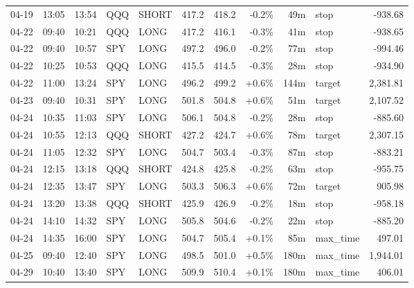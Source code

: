 \documentclass[11pt,a4paper,twoside]{article}
\begin{document}
\begin{center}
\begin{longtable}{>{\color{txtmain}}l l l l l r r r r >{\color{txtmain}}l r}
04-19 & 13:05 & 13:54 & QQQ & SHORT & 417.2 & 418.2 & \textcolor{lossred}{-0.2\%} & 49m & stop & \textcolor{lossred}{-938.68} \\
04-22 & 09:40 & 10:21 & QQQ & LONG & 417.2 & 416.1 & \textcolor{lossred}{-0.3\%} & 41m & stop & \textcolor{lossred}{-938.65} \\
04-22 & 09:40 & 10:57 & SPY & LONG & 497.2 & 496.0 & \textcolor{lossred}{-0.2\%} & 77m & stop & \textcolor{lossred}{-994.46} \\
04-22 & 10:25 & 10:53 & QQQ & LONG & 415.5 & 414.5 & \textcolor{lossred}{-0.3\%} & 28m & stop & \textcolor{lossred}{-934.90} \\
04-22 & 11:00 & 13:24 & SPY & LONG & 496.2 & 499.2 & \textcolor{wingreen}{+0.6\%} & 144m & target & \textcolor{wingreen}{2,381.81} \\
04-23 & 09:40 & 10:31 & SPY & LONG & 501.8 & 504.8 & \textcolor{wingreen}{+0.6\%} & 51m & target & \textcolor{wingreen}{2,107.52} \\
04-24 & 10:35 & 11:03 & SPY & LONG & 506.1 & 504.8 & \textcolor{lossred}{-0.2\%} & 28m & stop & \textcolor{lossred}{-885.60} \\
04-24 & 10:55 & 12:13 & QQQ & SHORT & 427.2 & 424.7 & \textcolor{wingreen}{+0.6\%} & 78m & target & \textcolor{wingreen}{2,307.15} \\
04-24 & 11:05 & 12:32 & SPY & LONG & 504.7 & 503.4 & \textcolor{lossred}{-0.3\%} & 87m & stop & \textcolor{lossred}{-883.21} \\
04-24 & 12:15 & 13:18 & QQQ & SHORT & 424.8 & 425.8 & \textcolor{lossred}{-0.2\%} & 63m & stop & \textcolor{lossred}{-955.75} \\
04-24 & 12:35 & 13:47 & SPY & LONG & 503.3 & 506.3 & \textcolor{wingreen}{+0.6\%} & 72m & target & \textcolor{wingreen}{905.98} \\
04-24 & 13:20 & 13:38 & QQQ & SHORT & 425.9 & 426.9 & \textcolor{lossred}{-0.2\%} & 18m & stop & \textcolor{lossred}{-958.18} \\
04-24 & 14:10 & 14:32 & SPY & LONG & 505.8 & 504.6 & \textcolor{lossred}{-0.2\%} & 22m & stop & \textcolor{lossred}{-885.20} \\
04-24 & 14:35 & 16:00 & SPY & LONG & 504.7 & 505.4 & \textcolor{wingreen}{+0.1\%} & 85m & max\_time & \textcolor{wingreen}{497.01} \\
04-25 & 09:40 & 12:40 & SPY & LONG & 498.5 & 501.0 & \textcolor{wingreen}{+0.5\%} & 180m & max\_time & \textcolor{wingreen}{1,944.01} \\
04-29 & 10:40 & 13:40 & SPY & LONG & 509.9 & 510.4 & \textcolor{wingreen}{+0.1\%} & 180m & max\_time & \textcolor{wingreen}{406.01} \\

\end{longtable}
\end{center}
\end{document}

